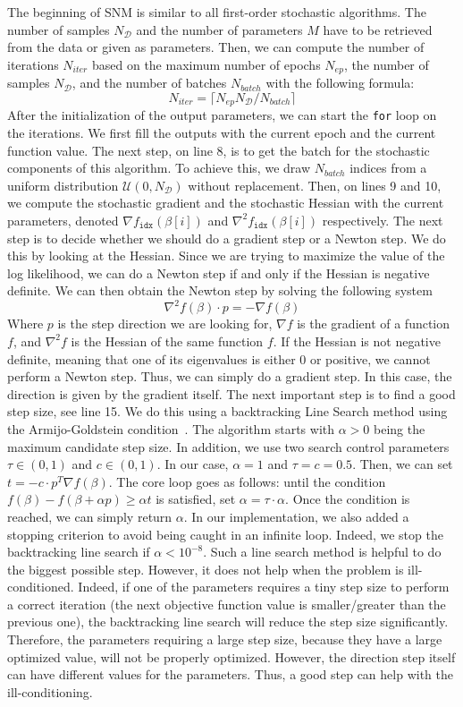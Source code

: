 \documentclass[conference]{IEEEtran}
\begin{document}
The beginning of SNM is similar to all first-order stochastic algorithms. The number of samples $N_{\mathcal{D}}$ and the number of parameters $M$ have to be retrieved from the data or given as parameters. Then, we can compute the number of iterations $N_{iter}$ based on the maximum number of epochs $N_{ep}$, the number of samples $N_{\mathcal{D}}$, and the number of batches $N_{batch}$ with the following formula:
\[
N_{iter} = \lceil N_{ep}N_{\mathcal{D}}/N_{batch} \rceil
\]
After the initialization of the output parameters, we can start the \texttt{for} loop on the iterations. We first fill the outputs with the current epoch and the current function value. The next step, on line 8, is to get the batch for the stochastic components of this algorithm. To achieve this, we draw $N_{batch}$ indices from a uniform distribution $\mathcal{U}(0, N_{\mathcal{D}})$ without replacement. Then, on lines 9 and 10, we compute the stochastic gradient and the stochastic Hessian with the current parameters, denoted $\nabla f_{\texttt{idx}}(\beta[i])$ and $\nabla^2 f_{\texttt{idx}}(\beta[i])$ respectively. The next step is to decide whether we should do a gradient step or a Newton step. We do this by looking at the Hessian. Since we are trying to maximize the value of the log likelihood, we can do a Newton step if and only if the Hessian is negative definite. We can then obtain the Newton step by solving the following system
\[
\nabla^2 f(\beta) \cdot p = - \nabla f(\beta)
\]
Where $p$ is the step direction we are looking for, $\nabla f$ is the gradient of a function $f$, and $\nabla^2 f$ is the Hessian of the same function $f$. If the Hessian is not negative definite, meaning that one of its eigenvalues is either 0 or positive, we cannot perform a Newton step. Thus, we can simply do a gradient step. In this case, the direction is given by the gradient itself. The next important step is to find a good step size, see line 15. We do this using a backtracking Line Search method using the Armijo-Goldstein condition~\cite{armijo_minimization_1966}. The algorithm starts with $\alpha>0$ being the maximum candidate step size. In addition, we use two search control parameters $\tau\in(0,1)$ and $c\in(0,1)$. In our case, $\alpha=1$ and $\tau=c=0.5$. Then, we can set $t = -c\cdot p^T\nabla f(\beta)$. The core loop goes as follows: until the condition $f(\beta) - f(\beta + \alpha p) \geq \alpha t$ is satisfied, set $\alpha = \tau \cdot \alpha$. Once the condition is reached, we can simply return $\alpha$. In our implementation, we also added a stopping criterion to avoid being caught in an infinite loop. Indeed, we stop the backtracking line search if $\alpha < 10^{-8}$. Such a line search method is helpful to do the biggest possible step. However, it does not help when the problem is ill-conditioned. Indeed, if one of the parameters requires a tiny step size to perform a correct iteration (the next objective function value is smaller/greater than the previous one), the backtracking line search will reduce the step size significantly. Therefore, the parameters requiring a large step size, because they have a large optimized value, will not be properly optimized. However, the direction step itself can have different values for the parameters. Thus, a good step can help with the ill-conditioning.
\end{document}
